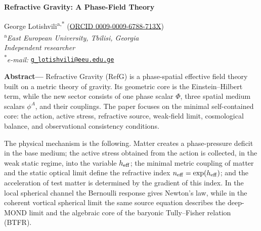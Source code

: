 \documentclass[12pt]{article}
\begin{document}
\begin{center}
\vspace*{1.15cm}
{\large\bfseries Refractive Gravity: A Phase-Field Theory\par}
\vspace{1.65em}
George Lotishvili\textsuperscript{a,*} (\href{https://orcid.org/0009-0009-6788-713X}{ORCID 0009-0009-6788-713X})\\
\vspace{1.45em}
\textsuperscript{a}\textit{East European University, Tbilisi, Georgia}\\
\textit{Independent researcher}\\
\vspace{1.15em}
\textsuperscript{*}\textit{e-mail:} \href{mailto:g_lotishvili@eeu.edu.ge}{\texttt{g\_lotishvili@eeu.edu.ge}}
\end{center}

\vspace{1.1em}
\noindent\textbf{Abstract---}
Refractive Gravity (RefG) is a phase-spatial effective field theory built on a metric theory of gravity. Its geometric core is the Einstein--Hilbert term, while the new sector consists of one phase scalar $\Phi$, three spatial medium scalars $\phi^A$, and their couplings. The paper focuses on the minimal self-contained core: the action, active stress, refractive source, weak-field limit, cosmological balance, and observational consistency conditions.

The physical mechanism is the following. Matter creates a phase-pressure deficit in the base medium; the active stress obtained from the action is collected, in the weak static regime, into the variable $h_{\rm eff}$; the minimal metric coupling of matter and the static optical limit define the refractive index $n_{\rm eff}=\exp(h_{\rm eff})$; and the acceleration of test matter is determined by the gradient of this index. In the local spherical channel the Bernoulli response gives Newton's law, while in the coherent vortical spherical limit the same source equation describes the deep-MOND limit and the algebraic core of the baryonic Tully--Fisher relation (BTFR).
\end{document}
